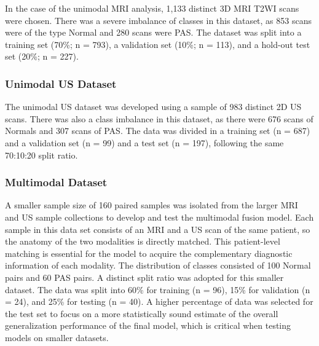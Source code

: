 \documentclass[12pt]{article}
\begin{document}
In the case of the unimodal MRI analysis, 1,133 distinct 3D MRI T2WI scans were chosen. There was a severe imbalance of classes in this dataset, as 853 scans were of the type Normal and 280 scans were PAS. The dataset was split into a training set (70\%; n = 793), a validation set (10\%; n = 113), and a hold-out test set (20\%; n = 227). 

\subsubsection{Unimodal US Dataset}

The unimodal US dataset was developed using a sample of 983 distinct 2D US scans. There was also a class imbalance in this dataset, as there were 676 scans of Normals and 307 scans of PAS. The data was divided in a training set (n = 687) and a validation set (n = 99) and a test set (n = 197), following the same 70:10:20 split ratio.

\subsubsection{Multimodal Dataset}

A smaller sample size of 160 paired samples was isolated from the larger MRI and US sample collections to develop and test the multimodal fusion model. Each sample in this data set consists of an MRI and a US scan of the same patient, so the anatomy of the two modalities is directly matched. This patient-level matching is essential for the model to acquire the complementary diagnostic information of each modality. The distribution of classes consisted of 100 Normal pairs and 60 PAS pairs. A distinct split ratio was adopted for this smaller dataset. The data was split into 60\% for training (n = 96), 15\% for validation (n = 24), and 25\% for testing (n = 40). A higher percentage of data was selected for the test set to focus on a more statistically sound estimate of the overall generalization performance of the final model, which is critical when testing models on smaller datasets.
\end{document}

